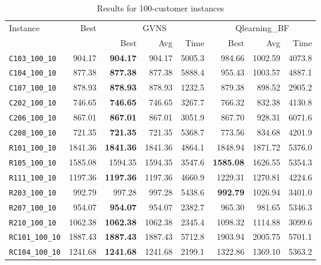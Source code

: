 \begin{table}[ht]
\centering
\small
\setlength{\tabcolsep}{5pt}
\caption{Results for 100-customer instances}
\vspace{4mm}
\begin{adjustbox}{width=\textwidth}
\begin{tabular}{l r r r r @{\hspace{8pt}} r r r @{\hspace{8pt}}}
\toprule
\multirow{2}{*}{Instance} & \multirow{2}{*}{Best} & \multicolumn{3}{c}{GVNS} & \multicolumn{3}{c}{Qlearning\_BF} \\
\cmidrule(lr){3-5} \cmidrule(lr){6-8}
 &  & Best & Avg & Time & Best & Avg & Time \\
\midrule
\texttt{C103\_100\_10} & 904.17 & \textbf{904.17} & 904.17 & 5005.3 & 984.66 & 1002.59 & 4073.8 \\
\texttt{C104\_100\_10} & 877.38 & \textbf{877.38} & 877.38 & 5888.4 & 955.43 & 1003.57 & 4887.1 \\
\texttt{C107\_100\_10} & 878.93 & \textbf{878.93} & 878.93 & 1232.5 & 879.38 & 898.52 & 2905.2 \\
\texttt{C202\_100\_10} & 746.65 & \textbf{746.65} & 746.65 & 3267.7 & 766.32 & 832.38 & 4130.8 \\
\texttt{C206\_100\_10} & 867.01 & \textbf{867.01} & 867.01 & 3051.9 & 867.70 & 928.31 & 6071.6 \\
\texttt{C208\_100\_10} & 721.35 & \textbf{721.35} & 721.35 & 5368.7 & 773.56 & 834.68 & 4201.9 \\
\texttt{R101\_100\_10} & 1841.36 & \textbf{1841.36} & 1841.36 & 4864.1 & 1848.94 & 1871.72 & 5376.0 \\
\texttt{R105\_100\_10} & 1585.08 & 1594.35 & 1594.35 & 3547.6 & \textbf{1585.08} & 1626.55 & 5354.3 \\
\texttt{R111\_100\_10} & 1197.36 & \textbf{1197.36} & 1197.36 & 4660.9 & 1229.31 & 1270.81 & 4224.6 \\
\texttt{R203\_100\_10} & 992.79 & 997.28 & 997.28 & 5438.6 & \textbf{992.79} & 1026.94 & 3401.0 \\
\texttt{R207\_100\_10} & 954.07 & \textbf{954.07} & 954.07 & 2382.7 & 965.30 & 981.65 & 5346.3 \\
\texttt{R210\_100\_10} & 1062.38 & \textbf{1062.38} & 1062.38 & 2345.4 & 1098.32 & 1114.88 & 3099.6 \\
\texttt{RC101\_100\_10} & 1887.43 & \textbf{1887.43} & 1887.43 & 5712.8 & 1903.94 & 2005.75 & 5701.1 \\
\texttt{RC104\_100\_10} & 1241.68 & \textbf{1241.68} & 1241.68 & 2199.1 & 1322.86 & 1369.10 & 5363.2 \\

\end{tabular}
\end{adjustbox}
\end{table}

